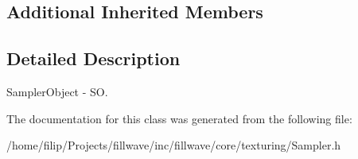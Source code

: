 \subsection*{Additional Inherited Members}


\subsection{Detailed Description}
Sampler\+Object -\/ S\+O. 

The documentation for this class was generated from the following file\+:\begin{DoxyCompactItemize}
\item 
/home/filip/\+Projects/fillwave/inc/fillwave/core/texturing/Sampler.\+h\end{DoxyCompactItemize}
